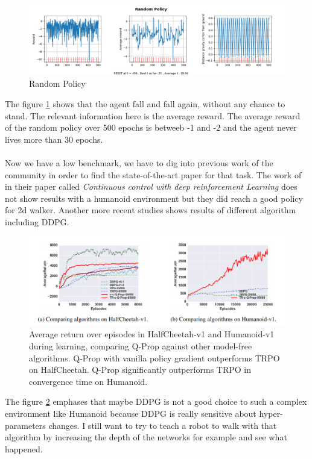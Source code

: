 \documentclass{article}
\begin{document}
\begin{figure}[ht]
  \centering
  \includegraphics[width=.8\textwidth]{randompolicy}
  \caption{Random Policy}
  \label{fig:randompolicy}
\end{figure}

The figure \ref{fig:randompolicy} shows that the agent fall and fall again,
without any chance to stand. The relevant information here is the average
reward. The average reward of the random policy over 500 epochs is betweeb -1
and -2 and the agent never lives more than 30 epochs.
\paragraph{}
Now we have a low benchmark, we have to dig into previous work of the community
in order to find the state-of-the-art paper for that task. The work of
\citeauthor{journals/corr/LillicrapHPHETS15} in their paper called
\textit{Continuous control with deep reinforcement Learning} does not show
results with a humanoid environment but they did reach a good policy for 2d
walker. Another more recent studies\cite{GuLilGhaTurLev17} shows results of
different algorithm including DDPG. 

\begin{figure}[ht]
  \centering
  \includegraphics[width=.8\textwidth]{benchmark}
  \caption{Average return over episodes in HalfCheetah-v1 and Humanoid-v1 during
    learning, comparing Q-Prop against other model-free algorithms. Q-Prop with
    vanilla policy gradient outperforms TRPO on HalfCheetah. Q-Prop
    significantly outperforms TRPO in convergence time on Humanoid.}
  \label{fig:benchmark}
\end{figure}

The figure \ref{fig:benchmark} emphases that maybe DDPG is not a good choice to
such a complex environment like Humanoid because DDPG is really sensitive about
hyper-parameters changes. I still want to try to teach a robot to walk with that
algorithm by increasing the depth of the networks for example and see what
happened.  
\end{document}
